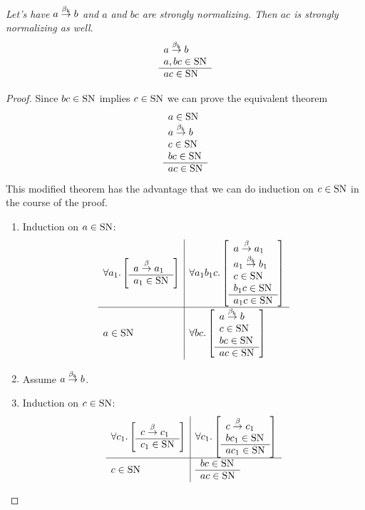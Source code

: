 \begin{theorem}
    \label{StronglyNormalizingKeyExpansion}
    \emph{Let's have $a \stackrel{\beta_{\text{k}}}{\to} b$ and $a$ and $bc$ are strongly normalizing.
    Then $ac$ is strongly normalizing as well}.
    $$
    \begin{array}{l} 
        a \stackrel{\beta_{\text{k}}}{\to} b
        \\
        a, bc \in \text{SN}
     \\ \hline 
        ac \in \text{SN}
    \end{array}
    $$
    \begin{proof}
        Since $bc \in \text{SN}$ implies $c \in \text{SN}$ we can prove the equivalent
        theorem
        $$
        \begin{array}{l} 
            a \in \text{SN}
            \\
            a \stackrel{\beta_{\text{k}}}{\to} b
            \\
            c \in \text{SN}
            \\
            bc \in \text{SN}
         \\ \hline 
            ac \in \text{SN}
        \end{array}
        $$
        This modified theorem has the advantage that we can do induction on $c
        \in \text{SN}$ in the course of the proof.

        \begin{enumerate}
        \item Induction on $a \in \text{SN}$:
            $$
            \begin{array}{l|l} \forall a_1. \left[ \begin{array}{l} a \stackrel{\beta}{\to} a_1 \\ \hline a_1 \in \text{SN}\end{array} \right] & 
                    \forall a_1 b_1 c. \left[ \begin{array}{l} 
                        a \stackrel{\beta}{\to} a_1
                        \\
                        a_1 \stackrel{\beta_{\text{k}}}{\to} b_1
                        \\
                        c \in \text{SN}
                        \\
                        b_1 c \in \text{SN}
                     \\ \hline a_1 c \in \text{SN}\end{array} \right]
                 \\ \hline a \in \text{SN} & 
                    \forall b c. \left[ \begin{array}{l} 
                        a \stackrel{\beta_{\text{k}}}{\to} b
                        \\
                        c \in \text{SN}
                        \\
                        bc \in \text{SN}
                     \\ \hline ac \in \text{SN}\end{array} \right]
                 \end{array}
            $$

        \item Assume $a \stackrel{\beta_{\text{k}}}{\to} b$.

        \item Induction on $c \in \text{SN}$:
            $$
            \begin{array}{l|l} \forall c_1. \left[ \begin{array}{l} c \stackrel{\beta}{\to} c_1 \\ \hline c_1 \in \text{SN}\end{array} \right] & 
                    \forall c_1. \left[ \begin{array}{l} 
                        c \stackrel{\beta}{\to} c_1
                        \\
                        bc_1 \in \text{SN}
                     \\ \hline a c_1 \in \text{SN}\end{array} \right]
                 \\ \hline c \in \text{SN} & 
                    \begin{array}{l} 
                        bc \in \text{SN}
                     \\ \hline ac \in \text{SN}\end{array}
                 \end{array}
            $$


\end{enumerate}
\end{proof}
\end{theorem}
